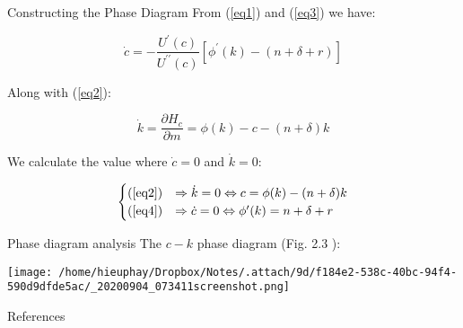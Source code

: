 \documentclass[10pt]{beamer}
\begin{document}
\begin{frame}[label={sec:org324a8ee}]{Constructing the Phase Diagram}
From (\ref{eq1}) and (\ref{eq3}) we have:

\begin{equation} \label{eq4}
  \dot{c} = - \frac{U^{\prime}(c)}{U^{\prime\prime}(c)}\left[\phi^{\prime}(k) - (n + \delta + r)\right]
\end{equation}

Along with (\ref{eq2}):

$$
\dot{k} = \frac{\partial H_{c}}{\partial m} = \phi(k) - c - (n + \delta)k
$$

We calculate the value where \(\dot{c} = 0\) and \(\dot{k} = 0\):

\begin{align}
  \begin{cases}
    (\ref{eq2}) &\Rightarrow \dot{k}=0 \Leftrightarrow c = \phi(k) - (n + \delta)k \\
    (\ref{eq4}) &\Rightarrow \dot{c}=0 \Leftrightarrow \phi^{\prime}(k) = n + \delta + r
  \end{cases}
\end{align}
\end{frame}

\begin{frame}[label={sec:orgfc4ee05}]{Phase diagram analysis}
The \(c-k\) phase diagram (Fig. 2.3 \cite{romer19_advan}):

\begin{center}
\texttt{[image: /home/hieuphay/Dropbox/Notes/.attach/9d/f184e2-538c-40bc-94f4-590d9dfde5ac/\_20200904\_073411screenshot.png]}
\end{center}
\end{frame}


\begin{frame}[allowframebreaks]{References}
\printbibliography
\end{frame}
\end{document}
